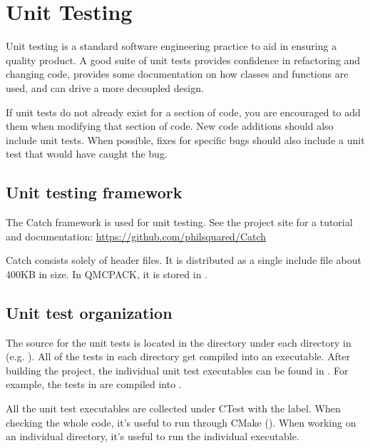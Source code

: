 \chapter{Unit Testing}
\label{chap:unit_testing}

Unit testing is a standard software engineering practice to aid in ensuring a quality product. A good suite of unit tests provides confidence in refactoring and changing code, provides some documentation on how classes and functions are used, and can drive a more decoupled design.

If unit tests do not already exist for a section of code, you are encouraged to add them when modifying that section of code.  New code additions should also include unit tests.
When possible, fixes for specific bugs should also include a unit test that would have caught the bug.

\section {Unit testing framework} The Catch framework is used for unit testing.
See the project site for a tutorial and documentation: \url{https://github.com/philsquared/Catch}

Catch consists solely of header files. It is distributed as a single include file about 400KB in size.  In QMCPACK, it is stored in .

\section{Unit test organization}

\begin{sloppypar}
The source for the unit tests is located in the  directory under each directory in  (e.g. ).
All of the tests in each  directory get compiled into an executable.
After building the project, the individual unit test executables can be found in .
For example, the tests in  are compiled into .
\end{sloppypar}

All the unit test executables are collected under CTest with the  label.
When checking the whole code, it's useful to run through CMake ().
When working on an individual directory, it's useful to run the individual executable.

